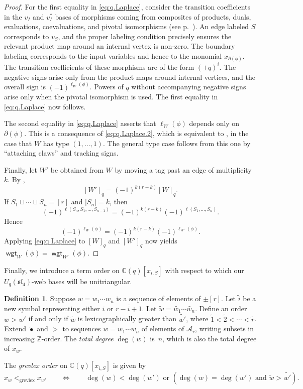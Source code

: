 \documentclass{amsart}
\theoremstyle{definition}
\newtheorem{definition}[theorem]{Definition}
\theoremstyle{remark}
\numberwithin{equation}{section}
\newcommand{\fsl}{\mathfrak{sl}}
\DeclareMathOperator{\wgt}{\mathsf{wgt}}
\DeclareMathOperator{\tlex}{l\widetilde{ex}}
\DeclareMathOperator{\grevlex}{grevlex}
\begin{document}
\begin{proof}
    For the first equality in \eqref{eq:q.Laplace}, consider the transition coefficients in the $v_I$ and $v_I^*$ bases of morphisms coming from composites of products, duals, evaluations, coevaluations, and pivotal isomorphisms (see p.~\pageref{pg:transition_coeff}). An edge labeled $S$ corresponds to $v_S$, and the proper labeling condition precisely ensures the relevant product map around an internal vertex is non-zero. The boundary labeling corresponds to the input variables and hence to the monomial $x_{\partial(\phi)}$. The transition coefficients of these morphisms are of the form $(\pm q)^i$. The negative signs arise only from the product maps around internal vertices, and the overall sign is $(-1)^{\ell_W(\phi)}$. Powers of $q$ without accompanying negative signs arise only when the pivotal isomorphism is used. The first equality in \eqref{eq:q.Laplace} now follows.

    The second equality in \eqref{eq:q.Laplace} asserts that $\ell_W(\phi)$ depends only on $\partial(\phi)$. This is a consequence of \eqref{eq:q.Laplace.2}, which is equivalent to \cite[Lem.~5.4]{Fraser-Lam-Le}, in the case that $W$ has type $(1, \ldots, 1)$. The general type case follows from this one by ``attaching claws'' and tracking signs.

    Finally, let $W'$ be obtained from $W$ by moving a tag past an edge of multiplicity $k$. By ,
      \[ [W']_q = (-1)^{k(r-k)} [W]_q. \]
    If $S_1 \sqcup \cdots \sqcup S_n = [r]$ and $|S_n|=k$, then
      \[ (-1)^{\ell(S_n, S_1, \ldots, S_{n-1})} = (-1)^{k(r-k)} (-1)^{\ell(S_1, \ldots, S_n)}. \]
    Hence
      \[ (-1)^{\ell_W(\phi)} = (-1)^{k(r-k)} (-1)^{\ell_{W'}(\phi)}. \]
    Applying \eqref{eq:q.Laplace} to $[W]_q$ and $[W']_q$ now yields $\wgt_W(\phi) = \wgt_{W'}(\phi)$.
\end{proof}

Finally, we introduce a term order on $\mathbb{C}(q)[x_{i, S}]$ with respect to which our $U_q(\fsl_4)$-web bases will be unitriangular.

\begin{definition}\label{def:grevlex}
    Suppose $w = w_1 \cdots w_n$ is a sequence of elements of $\pm[r]$. Let $\widetilde{i}$ be a new symbol representing either $i$ or $\overline{r-i+1}$. Let $\widetilde{w} = \widetilde{w_1} \cdots \widetilde{w_n}$. Define an order $w >_{\tlex} w'$ if and only if $\widetilde{w}$ is lexicographically greater than $\widetilde{w'}$, where $\widetilde{1} < \widetilde{2} < \cdots < \widetilde{r}$. Extend $\widetilde{\bullet}$ and $>_{\tlex}$ to sequences $w = w_1 \cdots w_n$ of elements of $\mathcal{A}_r$, writing subsets in increasing $\mathbb{Z}$-order. The \emph{total degree} $\deg(w)$ is~$n$, which is also the total degree of $x_w$.

    The \emph{grevlex order} on $\mathbb{C}(q)[x_{i, S}]$ is given by
      \[ x_w <_{\grevlex} x_{w'} \qquad\Leftrightarrow\qquad \deg(w) < \deg(w') \text{ or } (\deg(w) = \deg(w') \text{ and } \widetilde{w} >_{\tlex} \widetilde{w'}). \]
\end{definition}
\end{document}
